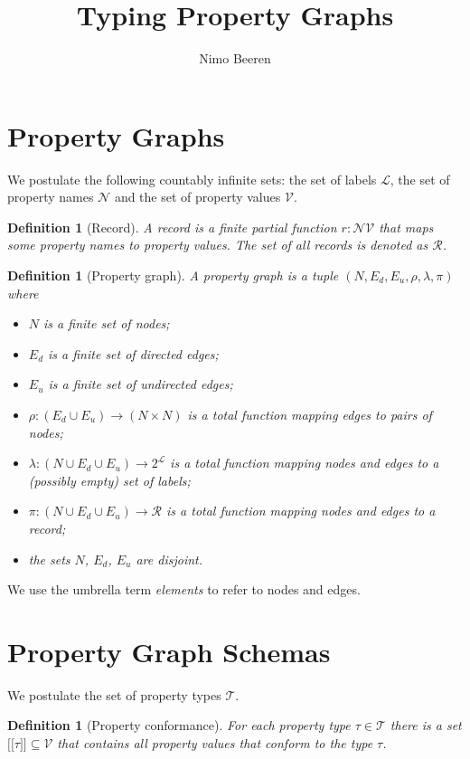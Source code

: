 \documentclass[a4paper]{article}
\title{Typing Property Graphs}
\author{Nimo Beeren}
\makeatletter
\newtheorem{definition}[theorem]{Definition}
\newcommand{\ptype}{\tau}
\newcommand{\ptypes}{\mathcal{T}}
\newcommand{\lsem}{\ensuremath{[\![}}
\newcommand{\rsem}{\ensuremath{]\!]}}
\newcommand{\sem}[1]{\ensuremath{\lsem #1 \rsem}}
\newcommand{\pto}{}%
\DeclareRobustCommand{\pto}{\mathrel{\mathpalette\p@to@gets\to}}
\newcommand{\p@to@gets}[2]{%
  \ooalign{\hidewidth$\m@th#1\mapstochar\mkern5mu$\hidewidth\cr$\m@th#1\to$\cr}%
}
\makeatother
\begin{document}
\section{Property Graphs}

We postulate the following countably infinite sets: the set of labels $\mathcal{L}$, the set of property names $\mathcal{N}$ and the set of property values $\mathcal{V}$.

\begin{definition}[Record]
  A \emph{record} is a finite partial function $r : \mathcal{N} \pto \mathcal{V}$ that maps some property names to property values. The set of all records is denoted as $\mathcal{R}$.
\end{definition}

\begin{definition}[Property graph]
  A \emph{property graph} is a tuple $(N, E_d, E_u, \rho, \lambda, \pi)$ where
  \begin{itemize}
    \item $N$ is a finite set of nodes;
    \item $E_d$ is a finite set of directed edges;
    \item $E_u$ is a finite set of undirected edges;
    \item $\rho : (E_d \cup E_u) \to (N \times N)$ is a total function mapping edges to pairs of nodes;
    \item $\lambda : (N \cup E_d \cup E_u) \to 2^{\mathcal{L}}$ is a total function mapping nodes and edges to a (possibly empty) set of labels;
    \item $\pi : (N \cup E_d \cup E_u) \to \mathcal{R}$ is a total function mapping nodes and edges to a record;
    \item the sets $N$, $E_d$, $E_u$ are disjoint.
  \end{itemize}
\end{definition}

We use the umbrella term \emph{elements} to refer to nodes and edges.

\section{Property Graph Schemas}

We postulate the set of property types $\mathcal{T}$.

\begin{definition}[Property conformance]
  For each property type $\ptype \in \ptypes$ there is a set $\sem{\ptype} \subseteq \mathcal{V}$ that contains all property values that \emph{conform} to the type $\ptype$.
\end{definition}
\end{document}
